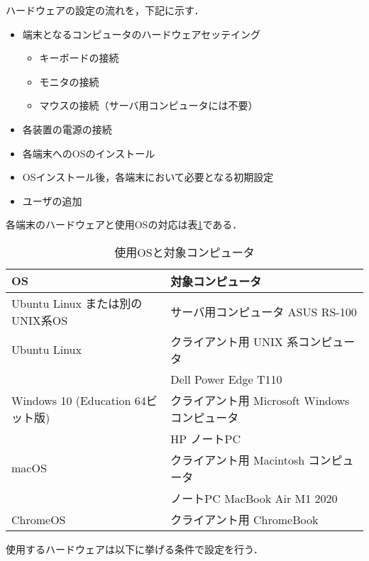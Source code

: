 ハードウェアの設定の流れを，下記に示す．
\begin{itemize}
  \item 端末となるコンピュータのハードウェアセッテイング
	\begin{itemize}
	 \item キーボードの接続
         \item モニタの接続
	 \item マウスの接続（サーバ用コンピュータには不要）
	\end{itemize}
  \item 各装置の電源の接続
  \item 各端末へのOSのインストール
  \item OSインストール後，各端末において必要となる初期設定
  \item ユーザの追加
\end{itemize}


各端末のハードウェアと使用OSの対応は表\ref{tab:01:osandcomp}である．

\begin{table}[ht]
 \caption{使用OSと対象コンピュータ}
 \label{tab:01:osandcomp}
 \begin{center}
  \begin{tabular}{l|l}
    \hline
     OS  &  対象コンピュータ  \\
    \hline
     Ubuntu Linux または別の UNIX系OS & サーバ用コンピュータ ASUS RS-100   \\
     Ubuntu Linux & クライアント用 UNIX 系コンピュータ\\
            & Dell Power Edge T110 \\
     Windows 10 (Education 64ビット版)& クライアント用 Microsoft Windows
   コンピュータ \\
	   & HP ノートPC   \\
     macOS & クライアント用 Macintosh コンピュータ\\
     & ノートPC MacBook Air M1 2020 \\
     ChromeOS　& クライアント用 ChromeBook \\
    \hline
  \end{tabular}
 \end{center}
\end{table}

使用するハードウェアは以下に挙げる条件で設定を行う．

